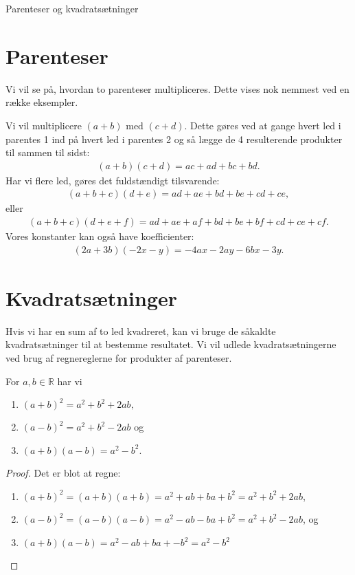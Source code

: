 \begin{center}
\Huge
Parenteser og kvadratsætninger
\end{center}
\section*{Parenteser}
Vi vil se på, hvordan to parenteser multipliceres. Dette vises nok nemmest ved en række eksempler.
\begin{exa}
Vi vil multiplicere $(a+b)$ med $(c+d)$. Dette gøres ved at gange hvert led i parentes 1 ind på hvert led i parentes 2 og så lægge de 4 resulterende produkter til sammen til sidst:
\begin{align*}
(a+b)(c+d) = ac+ad+bc+bd.
\end{align*}
Har vi flere led, gøres det fuldstændigt tilsvarende:
\begin{align*}
(a+b+c)(d+e) = ad+ae+bd+be+cd+ce,
\end{align*}
eller 
\begin{align*}
(a+b+c)(d+e+f) = ad+ae+af+bd+be+bf+cd+ce+cf.
\end{align*}
Vores konstanter kan også have koefficienter:
\begin{align*}
(2a+3b)(-2x-y) = -4ax-2ay-6bx-3y.
\end{align*}
\end{exa}
\section*{Kvadratsætninger}
Hvis vi har en sum af to led kvadreret, kan vi bruge de såkaldte kvadratsætninger til at bestemme resultatet. Vi vil udlede kvadratsætningerne ved brug af regnereglerne for produkter af parenteser.
\begin{setn}
For $a,b\in \mathbb{R}$ har vi
\begin{enumerate}[label=\roman*)]
\item $(a+b)^2 = a^2+b^2+2ab,$
\item $(a-b)^2 = a^2+b^2-2ab$ og 
\item $(a+b)(a-b) = a^2-b^2$.
\end{enumerate}
\end{setn}
\begin{proof}
Det er blot at regne:

\begin{enumerate}[label=$\roman*)$]
\item $(a+b)^2 = (a+b)(a+b)=a^2+ab+ba+b^2=a^2+b^2+2ab$,
\item $(a-b)^2 = (a-b)(a-b) = a^2-ab-ba+b^2 = a^2+b^2-2ab$, og
\item $(a+b)(a-b) = a^2-ab+ba+-b^2 = a^2-b^2$ 
\end{enumerate}
\end{proof}

